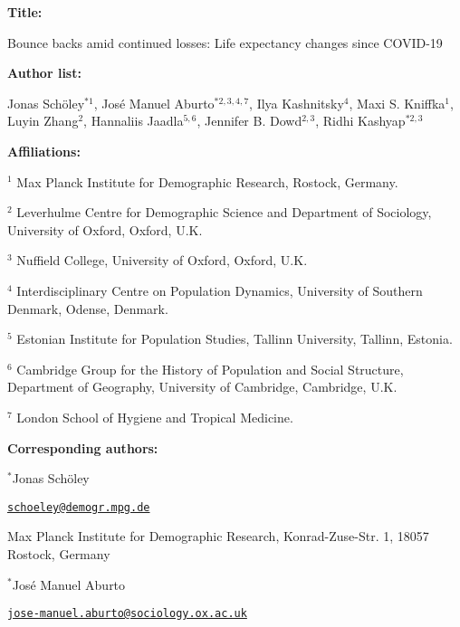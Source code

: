 \documentclass[12pt]{article}
\begin{document}
\begin{titlepage}


{\textbf{Title:}\par
Bounce backs amid continued losses: Life expectancy changes since COVID-19
\par\medskip}

{\textbf{Author list:}\par
Jonas Schöley$^{*1}$,
José Manuel Aburto$^{*2,3,4,7}$,
Ilya Kashnitsky$^{4}$,
Maxi S. Kniffka$^1$,
Luyin Zhang$^2$,
Hannaliis Jaadla$^{5,6}$,
Jennifer B. Dowd$^{2,3}$,
Ridhi Kashyap$^{*2,3}$
\par\medskip}

{\textbf{Affiliations:}\par
$^1$ Max Planck Institute for Demographic Research, Rostock, Germany.\par
$^2$ Leverhulme Centre for Demographic Science and Department of Sociology, University of Oxford, Oxford, U.K.\par
$^3$ Nuffield College, University of Oxford, Oxford, U.K.\par
$^4$ Interdisciplinary Centre on Population Dynamics, University of Southern Denmark, Odense, Denmark.\par
$^5$ Estonian Institute for Population Studies, Tallinn University, Tallinn, Estonia.\par
$^6$ Cambridge Group for the History of Population and Social Structure, Department of Geography, University of Cambridge, Cambridge, U.K.\par
$^7$ London School of Hygiene and Tropical Medicine.\par
\par\medskip}

{\textbf{Corresponding authors:}\par

$^{*}$Jonas Schöley

\href{mailto:schoeley@demogr.mpg.de}{\texttt{schoeley@demogr.mpg.de}}

Max Planck Institute for Demographic Research,
Konrad-Zuse-Str. 1,
18057 Rostock, Germany


\vspace{1em}

$^{*}$José Manuel Aburto

\href{mailto:jose-manuel.aburto@sociology.ox.ac.uk}{\texttt{jose-manuel.aburto@sociology.ox.ac.uk}}

}
\end{titlepage}
\end{document}
